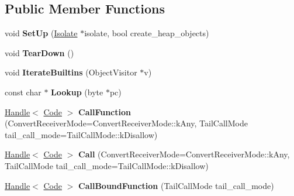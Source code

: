 \subsection*{Public Member Functions}
\begin{DoxyCompactItemize}
\item 
void {\bfseries Set\+Up} (\hyperlink{classv8_1_1internal_1_1_isolate}{Isolate} $\ast$isolate, bool create\+\_\+heap\+\_\+objects)\hypertarget{classv8_1_1internal_1_1_builtins_a75e1d9f48247554cfe5523c1daf71371}{}\label{classv8_1_1internal_1_1_builtins_a75e1d9f48247554cfe5523c1daf71371}

\item 
void {\bfseries Tear\+Down} ()\hypertarget{classv8_1_1internal_1_1_builtins_a0dd5f6b191e420297c6e6cfa801df51e}{}\label{classv8_1_1internal_1_1_builtins_a0dd5f6b191e420297c6e6cfa801df51e}

\item 
void {\bfseries Iterate\+Builtins} (Object\+Visitor $\ast$v)\hypertarget{classv8_1_1internal_1_1_builtins_a0da2dcc2e4d1c551beef7576b1f7f5c5}{}\label{classv8_1_1internal_1_1_builtins_a0da2dcc2e4d1c551beef7576b1f7f5c5}

\item 
const char $\ast$ {\bfseries Lookup} (byte $\ast$pc)\hypertarget{classv8_1_1internal_1_1_builtins_a22c3b1cfab8e834234d728c03e332e26}{}\label{classv8_1_1internal_1_1_builtins_a22c3b1cfab8e834234d728c03e332e26}

\item 
\hyperlink{classv8_1_1internal_1_1_handle}{Handle}$<$ \hyperlink{classv8_1_1internal_1_1_code}{Code} $>$ {\bfseries Call\+Function} (Convert\+Receiver\+Mode=Convert\+Receiver\+Mode\+::k\+Any, Tail\+Call\+Mode tail\+\_\+call\+\_\+mode=Tail\+Call\+Mode\+::k\+Disallow)\hypertarget{classv8_1_1internal_1_1_builtins_a9067c98a6f1a5cced3a81dcd9b70a687}{}\label{classv8_1_1internal_1_1_builtins_a9067c98a6f1a5cced3a81dcd9b70a687}

\item 
\hyperlink{classv8_1_1internal_1_1_handle}{Handle}$<$ \hyperlink{classv8_1_1internal_1_1_code}{Code} $>$ {\bfseries Call} (Convert\+Receiver\+Mode=Convert\+Receiver\+Mode\+::k\+Any, Tail\+Call\+Mode tail\+\_\+call\+\_\+mode=Tail\+Call\+Mode\+::k\+Disallow)\hypertarget{classv8_1_1internal_1_1_builtins_a57be91c127c9200caa62bfe50bcd72b1}{}\label{classv8_1_1internal_1_1_builtins_a57be91c127c9200caa62bfe50bcd72b1}

\item 
\hyperlink{classv8_1_1internal_1_1_handle}{Handle}$<$ \hyperlink{classv8_1_1internal_1_1_code}{Code} $>$ {\bfseries Call\+Bound\+Function} (Tail\+Call\+Mode tail\+\_\+call\+\_\+mode)\hypertarget{classv8_1_1internal_1_1_builtins_ab1d1f08f2182874f72a3db089214bc04}{}\label{classv8_1_1internal_1_1_builtins_ab1d1f08f2182874f72a3db089214bc04}


\end{DoxyCompactItemize}

